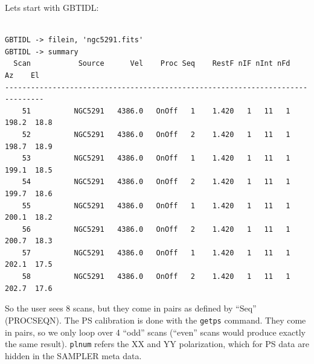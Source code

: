 \documentclass[12pt,a4paper]{article}
\begin{document}
Lets start with GBTIDL:

\begin{lstlisting}

GBTIDL -> filein, 'ngc5291.fits' 
GBTIDL -> summary
  Scan           Source      Vel    Proc Seq    RestF nIF nInt nFd     Az    El
-------------------------------------------------------------------------------
    51          NGC5291   4386.0   OnOff   1    1.420   1   11   1  198.2  18.8
    52          NGC5291   4386.0   OnOff   2    1.420   1   11   1  198.7  18.9
    53          NGC5291   4386.0   OnOff   1    1.420   1   11   1  199.1  18.5
    54          NGC5291   4386.0   OnOff   2    1.420   1   11   1  199.7  18.6
    55          NGC5291   4386.0   OnOff   1    1.420   1   11   1  200.1  18.2
    56          NGC5291   4386.0   OnOff   2    1.420   1   11   1  200.7  18.3
    57          NGC5291   4386.0   OnOff   1    1.420   1   11   1  202.1  17.5
    58          NGC5291   4386.0   OnOff   2    1.420   1   11   1  202.7  17.6
\end{lstlisting}

So the user sees 8 scans, but they come in pairs as defined by ``Seq'' (PROCSEQN).  The
PS calibration is done with the {\tt getps} command. They come in pairs, so we only
loop over 4 ``odd'' scans (``even'' scans would produce exactly the same result).
{\tt plnum} refers the XX and YY polarization, which for PS data are hidden in the SAMPLER
meta data.
\end{document}
